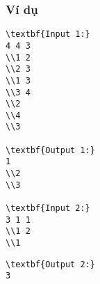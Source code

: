 \subsubsection{   Ví dụ  }
\begin{verbatim}
\textbf{Input 1:}
4 4 3
\\1 2
\\2 3
\\1 3
\\3 4
\\2
\\4
\\3

\textbf{Output 1:}
1
\\2
\\3

\textbf{Input 2:}
3 1 1
\\1 2
\\1 \end{verbatim}
\begin{verbatim}
\textbf{Output 2:}
3\end{verbatim}